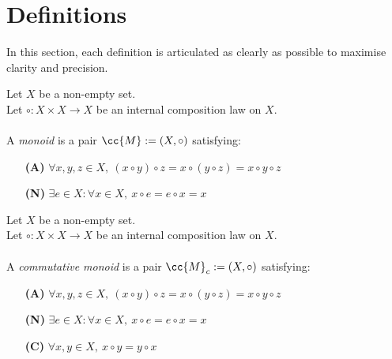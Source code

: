 \newpage
\section{Definitions}

In this section, each definition is articulated as clearly as possible to maximise clarity and precision.

\begin{definition-pre}[Monoid]
    \label{def:monoid}
    Let $X$ be a non-empty set.\\
    Let $\circ: X\times X \to X$ be an internal composition law on $X$. \\\\
    A \textit{monoid} is a pair $\cc{M}:= (X, \circ)$ satisfying:
    \begin{enumerate}
        \item [\textbf{(A)}] $\forall x,y,z\in X,\ (x\circ y)\circ z= x\circ (y\circ z) = x\circ y \circ z$
        \item [\textbf{(N)}] $\exists e \in X : \forall x \in X,\ x\circ e = e \circ x = x$
    \end{enumerate}
\end{definition-pre}

\begin{definition-pre}
    \label{def:commutative_monoid}
    Let $X$ be a non-empty set.\\
    Let $\circ: X\times X \to X$ be an internal composition law on $X$. \\\\
    A \textit{commutative monoid} is a pair $\cc{M}_c:= (X, \circ)$ satisfying:
    \begin{enumerate}
        \item [\textbf{(A)}] $\forall x,y,z\in X,\ (x\circ y)\circ z= x\circ (y\circ z) = x\circ y \circ z$
        \item [\textbf{(N)}] $\exists e \in X : \forall x \in X,\ x\circ e = e \circ x = x$
        \item [\textbf{(C)}] $\forall x,y\in X,\ x\circ y = y\circ x$
    \end{enumerate}
\end{definition-pre}

